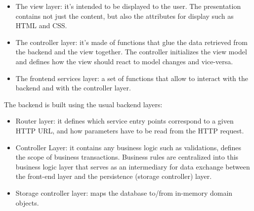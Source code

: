 \begin{legal}
\begin{legal}
				\begin{itemize}
					\item The view layer: it's intended to be displayed to the user. The presentation contains not just the content, but also the attributes for display such as HTML and CSS.
					\item The controller layer: it's made of functions that glue the data retrieved from the backend and the view together. The controller initializes the view model and defines how the view should react to model changes and vice-versa.
					\item The frontend services layer: a set of functions that allow to interact with the backend and with the controller layer.
				\end{itemize}
				The backend is built using the usual backend layers:
				\begin{itemize}
    				\item Router layer: it defines which service entry points correspond to a given HTTP URL, and how parameters have to be read from the HTTP request.
					\item Controller Layer: it contains any business logic such as validations, defines the scope of business transactions. Business rules are centralized into this business logic layer that serves as an intermediary for data exchange between the front-end layer and the persistence (storage controller) layer.
    				\item Storage controller layer: maps the database to/from in-memory domain objects.
				\end{itemize}
				\begin{figure}

\end{figure}
\end{legal}
\end{legal}
